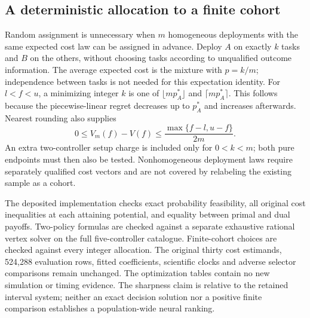 \subsection{A deterministic allocation to a finite cohort}
Random assignment is unnecessary when $m$ homogeneous deployments with the same expected cost law can be assigned in advance. Deploy $A$ on exactly $k$ tasks and $B$ on the others, without choosing tasks according to unqualified outcome information. The average expected cost is the mixture with $p=k/m$; independence between tasks is not needed for this expectation identity. For $l<f<u$, a minimizing integer $k$ is one of $\lfloor mp_A^*\rfloor$ and $\lceil mp_A^*\rceil$. This follows because the piecewise-linear regret decreases up to $p_A^*$ and increases afterwards. Nearest rounding also supplies
\[
 0\le V_m(f)-V(f)\le\frac{\max\{f-l,u-f\}}{2m}.
\]
An extra two-controller setup charge is included only for $0<k<m$; both pure endpoints must then also be tested. Nonhomogeneous deployment laws require separately qualified cost vectors and are not covered by relabeling the existing sample as a cohort.



The deposited implementation checks exact probability feasibility, all original cost inequalities at each attaining potential, and equality between primal and dual payoffs. Two-policy formulas are checked against a separate exhaustive rational vertex solver on the full five-controller catalogue. Finite-cohort choices are checked against every integer allocation. The original thirty cost estimands, 524,288 evaluation rows, fitted coefficients, scientific clocks and adverse selector comparisons remain unchanged. The optimization tables contain no new simulation or timing evidence. The sharpness claim is relative to the retained interval system; neither an exact decision solution nor a positive finite comparison establishes a population-wide neural ranking.
